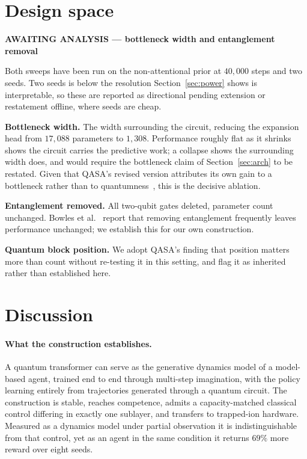 \documentclass[11pt,onecolumn]{article}
\newif\ifdraft
\newenvironment{pendingbox}[1]
  {\par\vspace{3pt}\noindent
   \begin{lrbox}{\pendbox}\begin{minipage}{0.93\linewidth}\small
   \textcolor{PendFG}{\textbf{AWAITING ANALYSIS --- #1}}\par\vspace{3pt}
   \color{PendFG}}
  {\end{minipage}\end{lrbox}%
   \ifdraft\fcolorbox{PendFG}{PendBG}{\usebox{\pendbox}}\fi
   \par\vspace{4pt}}
\begin{document}
\section{Design space}\label{sec:ablation}
\begin{pendingbox}{bottleneck width and entanglement removal}
Both sweeps have been run on the non-attentional prior at $40{,}000$
steps and two seeds. Two seeds is below the resolution
Section~\ref{sec:power} shows is interpretable, so these are reported as
directional pending extension or restatement offline, where seeds are
cheap.

\textbf{Bottleneck width.} The width surrounding the circuit, reducing
the expansion head from $17{,}088$ parameters to $1{,}308$. Performance
roughly flat as it shrinks shows the circuit carries the predictive
work; a collapse shows the surrounding width does, and would require the
bottleneck claim of Section~\ref{sec:arch} to be restated. Given that
QASA's revised version attributes its own gain to a bottleneck rather
than to quantumness~\cite{qasa}, this is the decisive ablation.

\textbf{Entanglement removed.} All two-qubit gates deleted, parameter
count unchanged. Bowles et al.~\cite{bowles2024} report that removing
entanglement frequently leaves performance unchanged; we establish this
for our own construction.

\textbf{Quantum block position.} We adopt QASA's finding that position
matters more than count without re-testing it in this setting, and flag
it as inherited rather than established here.
\end{pendingbox}

\section{Discussion}
\paragraph{What the construction establishes.}
A quantum transformer can serve as the generative dynamics model of a
model-based agent, trained end to end through multi-step imagination,
with the policy learning entirely from trajectories generated through a
quantum circuit. The construction is stable, reaches competence, admits
a capacity-matched classical control differing in exactly one sublayer,
and transfers to trapped-ion hardware. Measured as a dynamics model
under partial observation it is indistinguishable from that control,
yet as an agent in the same condition it returns $69\%$ more reward
over eight seeds.
\end{document}
